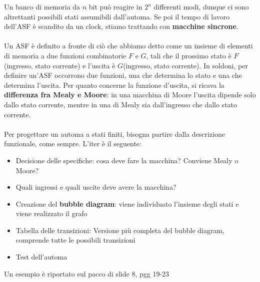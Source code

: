 \documentclass{book}
\begin{document}
        Un banco di memoria da $n$ bit può reagire in $2^{n}$ differenti modi, dunque ci sono altrettanti possibili stati assumibili dall'automa.
        Se poi il tempo di lavoro dell'ASF è scandito da un clock, stiamo trattando con \textbf{macchine sincrone}. \\ \\
        Un ASF è definito a fronte di ciò che abbiamo detto come un insieme di elementi di memoria a due funzioni combinatorie $F$ e $G$,
        tali che il prossimo stato è $F$(ingresso, stato corrente) e l'uscita è $G$(ingresso, stato corrente).
        In soldoni, per definire un'ASF occorrono due funzioni, una che determina lo stato e una che determina l'uscita. Per quanto 
        concerne la funzione d'uscita, si ricava la \textbf{differenza fra Mealy e Moore}: in una macchina di Moore l'uscita dipende solo dallo stato corrente,
        mentre in una di Mealy sia dall'ingresso che dallo stato corrente. \\ \\
        Per progettare un automa a stati finiti, bisogna partire dalla descrizione funzionale, come sempre.
        L'iter è il seguente:
        \begin{itemize}
            \item Decisione delle specifiche: cosa deve fare la macchina? Conviene Mealy o Moore? 
            \item Quali ingressi e quali uscite deve avere la macchina? 
            \item Creazione del \textbf{bubble diagram}: viene individuato l'insieme degli stati e viene realizzato 
            il grafo
            \item Tabella delle transizioni: Versione più completa del bubble diagram, comprende tutte le possibili transizioni 
            \item Test dell'automa 
        \end{itemize}
    Un esempio è riportato sul pacco di slide 8, pgg 19-23
\end{document}
